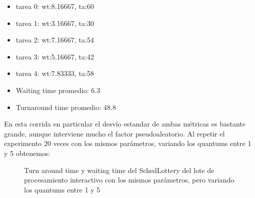 \begin{itemize}
  \item tarea 0: wt:8.16667, ta:60
  \item tarea 1: wt:3.16667, ta:30
  \item tarea 2: wt:7.16667, ta:54
  \item tarea 3: wt:5.16667, ta:42
  \item tarea 4: wt:7.83333, ta:58
  \item Waiting time promedio: 6.3
  \item Turnaround time promedio: 48.8
\end{itemize}

En esta corrida en particular el desvío estandar de ambas métricas es bastante grande, aunque interviene mucho el factor pseudoaleatorio.
Al repetir el experimento 20 veces con los mismos parámetros, variando los quantums entre 1 y 5 obtenemos:


\begin{figure}
\hfill
{}
\hfill
{}
\hfill
\caption{Turn around time y waiting time del SchedLottery del lote de procesamiento interactivo con los mismos parámetros,
	pero variando los quantums entre 1 y 5}
\end{figure}

